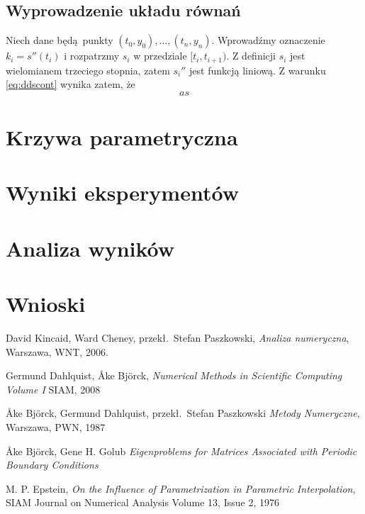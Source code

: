 \documentclass[11pt,wide]{mwart}
\begin{document}
\subsection{Wyprowadzenie układu równań}

Niech dane będą punkty $ (t_0, y_0) , \ldots, (t_n, y_n) $. Wprowadźmy oznaczenie $ k_i = s''(t_i) $ i rozpatrzmy $ s_i $ w przedziale $ [t_i, t_{i+1} ) $. Z definicji $ s_i $ jest wielomianem trzeciego stopnia, zatem $ s_i'' $ jest funkcją liniową. Z warunku \eqref{eq:ddscont} wynika zatem, że
\begin{equation}
	as
\end{equation}

\section{Krzywa parametryczna}
\section{Wyniki eksperymentów}
\section{Analiza wyników}
\section{Wnioski}

\begin{thebibliography}{99}

 David Kincaid, Ward Cheney, przekł.~Stefan Paszkowski,
\emph{Analiza numeryczna},
Warszawa, WNT, 2006.

 Germund Dahlquist, \r{A}ke Bj\"{o}rck,
\emph{Numerical Methods in Scientific Computing Volume I}
SIAM, 2008

 \r{A}ke Bj\"{o}rck, Germund Dahlquist, przekł.~Stefan Paszkowski
\emph{Metody Numeryczne},
Warszawa, PWN, 1987

 \r{A}ke Bj\"{o}rck, Gene H. Golub
\emph{Eigenproblems for Matrices Associated with Periodic Boundary Conditions}

 M. P. Epstein, 
\emph{On the Influence of Parametrization in Parametric Interpolation},
SIAM Journal on Numerical Analysis Volume 13, Issue 2, 1976


\end{thebibliography}
\end{document}
